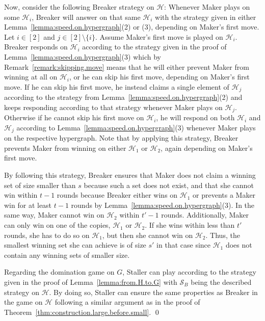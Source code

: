 \documentclass[reqno, 12pt]{amsart}
\numberwithin{equation}{section}
\numberwithin{figure}{section}
\begin{document}
Now, consider the following Breaker strategy on $\mathcal{H}$: Whenever Maker plays on some $\mathcal{H}_i$, Breaker will answer on that same $\mathcal{H}_i$ with the strategy given in either Lemma~\ref{lemma:speed.on.hypergraph}(2) or (3), depending on Maker's first move. Let $i \in [2]$ and $j \in [2] \setminus \{i\}$. Assume Maker's first move is played on $\mathcal{H}_i$. Breaker responds on $\mathcal{H}_i$ according to the strategy given in the proof of Lemma~\ref{lemma:speed.on.hypergraph}(3) which 
by Remark~\ref{remark:skipping.move} means that he will either prevent Maker from winning at all on $\mathcal{H}_i$, or he can skip his first move, depending on Maker's first move. If he can skip his first move, he instead claims a single element of $\mathcal{H}_j$ according to the strategy from Lemma~\ref{lemma:speed.on.hypergraph}(2) and keeps responding according to that strategy whenever Maker plays on $\mathcal{H}_j$. Otherwise if he cannot skip his first move on $\mathcal{H}_i$, he will respond on both $\mathcal{H}_i$ and $\mathcal{H}_j$ according to Lemma~\ref{lemma:speed.on.hypergraph}(3) whenever Maker plays on the respective hypergraph. Note that by applying this strategy, Breaker prevents Maker from winning on either $\mathcal{H}_1$ or $\mathcal{H}_2$, again depending on Maker's first move.

By following this strategy, Breaker ensures that Maker does not claim a winning set of size smaller than $s$ because such a set does not exist, and that she cannot win within $t - 1$ rounds because Breaker either wins on $\mathcal{H}_1$ or prevents a Maker win for at least $t - 1$ rounds by Lemma~\ref{lemma:speed.on.hypergraph}(3). In the same way, Maker cannot win on $\mathcal{H}_2$ within $t' - 1$ rounds. Additionally, Maker can only win on one of the copies, $\mathcal{H}_1$ or $\mathcal{H}_2$. If she wins within less than $t'$ rounds, she has to do so on $\mathcal{H}_1$, but then she cannot win on $\mathcal{H}_2$. Thus, the smallest winning set she can achieve is of size $s'$ in that case since $\mathcal{H}_1$ does not contain any winning sets of smaller size.

Regarding the domination game on $G$, Staller can play according to the strategy given in the proof of Lemma~\ref{lemma:from.H.to.G} with $\mathcal{S}_B$ being the described strategy on $\mathcal{H}$. By doing so, Staller can ensure the same properties as Breaker in the game on $\mathcal{H}$ following a similar argument as in the proof of Theorem~\ref{thm:construction.large.before.small}.
\qed
\end{document}
